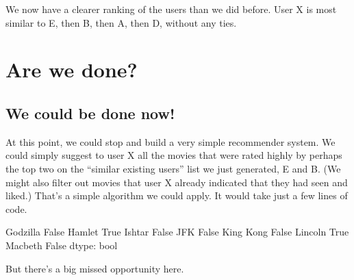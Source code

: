 \documentclass[letterpaper,10pt,english]{sphinxmanual}
\begin{document}
We now have a clearer ranking of the users than we did before.  User X is most similar to E, then B, then A, then D, without any ties.


\section{Are we done?}
\label{\detokenize{chapter-16-matrices:are-we-done}}

\subsection{We could be done now!}
\label{\detokenize{chapter-16-matrices:we-could-be-done-now}}
At this point, we could stop and build a very simple recommender system.  We could simply suggest to user X all the movies that were rated highly by perhaps the top two on the “similar existing users” list we just generated, E and B.  (We might also filter out movies that user X already indicated that they had seen and liked.)  That’s a simple algorithm we could apply.  It would take just a few lines of code.

\begin{sphinxVerbatim}[commandchars=\\\{\}]
  \PYG{p}{[}\PYG{p}{]}  
  \PYG{p}{[}\PYG{p}{]}  
    
        
\end{sphinxVerbatim}

\begin{sphinxVerbatim}[commandchars=\\\{\}]
Godzilla     False
Hamlet        True
Ishtar       False
JFK          False
King Kong    False
Lincoln       True
Macbeth      False
dtype: bool
\end{sphinxVerbatim}

But there’s a big missed opportunity here.
\end{document}
